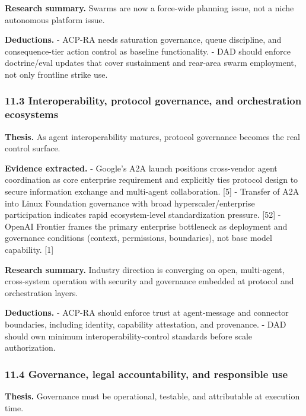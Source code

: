 \documentclass[11pt]{article}
\begin{document}
\textbf{Research summary.} Swarms are now a force-wide planning issue,
not a niche autonomous platform issue.

\textbf{Deductions.} - ACP-RA needs saturation governance, queue
discipline, and consequence-tier action control as baseline
functionality. - DAD should enforce doctrine/eval updates that cover
sustainment and rear-area swarm employment, not only frontline strike
use.

\hypertarget{interoperability-protocol-governance-and-orchestration-ecosystems}{%
\subsubsection{11.3 Interoperability, protocol governance, and
orchestration
ecosystems}\label{interoperability-protocol-governance-and-orchestration-ecosystems}}

\textbf{Thesis.} As agent interoperability matures, protocol governance
becomes the real control surface.

\textbf{Evidence extracted.} - Google's A2A launch positions
cross-vendor agent coordination as core enterprise requirement and
explicitly ties protocol design to secure information exchange and
multi-agent collaboration. {[}5{]} - Transfer of A2A into Linux
Foundation governance with broad hyperscaler/enterprise participation
indicates rapid ecosystem-level standardization pressure. {[}52{]} -
OpenAI Frontier frames the primary enterprise bottleneck as deployment
and governance conditions (context, permissions, boundaries), not base
model capability. {[}1{]}

\textbf{Research summary.} Industry direction is converging on open,
multi-agent, cross-system operation with security and governance
embedded at protocol and orchestration layers.

\textbf{Deductions.} - ACP-RA should enforce trust at agent-message and
connector boundaries, including identity, capability attestation, and
provenance. - DAD should own minimum interoperability-control standards
before scale authorization.

\hypertarget{governance-legal-accountability-and-responsible-use}{%
\subsubsection{11.4 Governance, legal accountability, and responsible
use}\label{governance-legal-accountability-and-responsible-use}}

\textbf{Thesis.} Governance must be operational, testable, and
attributable at execution time.
\end{document}
